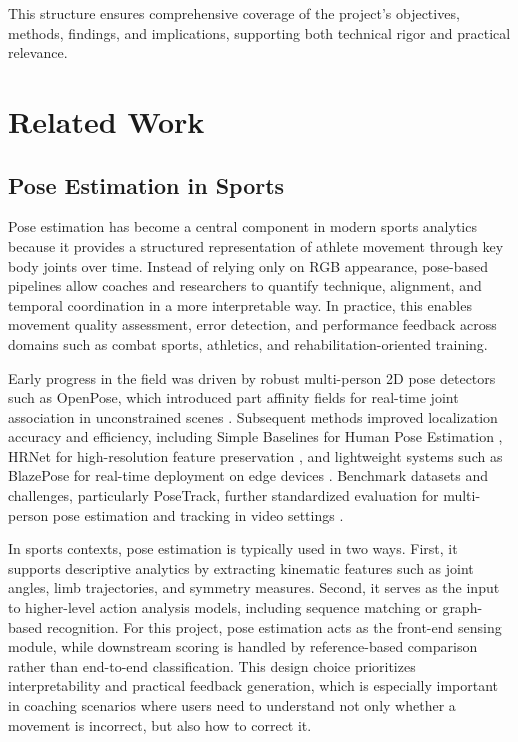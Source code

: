 \documentclass[12pt]{article}
\begin{document}
{This structure ensures comprehensive coverage of the project's objectives, methods, findings, and implications, supporting both technical rigor and practical relevance.

\section{Related Work}
\subsection{Pose Estimation in Sports}
Pose estimation has become a central component in modern sports analytics because it provides a structured representation of athlete movement through key body joints over time. Instead of relying only on RGB appearance, pose-based pipelines allow coaches and researchers to quantify technique, alignment, and temporal coordination in a more interpretable way. In practice, this enables movement quality assessment, error detection, and performance feedback across domains such as combat sports, athletics, and rehabilitation-oriented training.

Early progress in the field was driven by robust multi-person 2D pose detectors such as OpenPose, which introduced part affinity fields for real-time joint association in unconstrained scenes \cite{cao2017realtime}. Subsequent methods improved localization accuracy and efficiency, including Simple Baselines for Human Pose Estimation \cite{xiao2018simple}, HRNet for high-resolution feature preservation \cite{sun2019hrnet}, and lightweight systems such as BlazePose for real-time deployment on edge devices \cite{bazarevsky2020blazepose}. Benchmark datasets and challenges, particularly PoseTrack, further standardized evaluation for multi-person pose estimation and tracking in video settings \cite{andriluka2018posetrack}.

In sports contexts, pose estimation is typically used in two ways. First, it supports descriptive analytics by extracting kinematic features such as joint angles, limb trajectories, and symmetry measures. Second, it serves as the input to higher-level action analysis models, including sequence matching or graph-based recognition. For this project, pose estimation acts as the front-end sensing module, while downstream scoring is handled by reference-based comparison rather than end-to-end classification. This design choice prioritizes interpretability and practical feedback generation, which is especially important in coaching scenarios where users need to understand not only whether a movement is incorrect, but also how to correct it.

}
\end{document}

